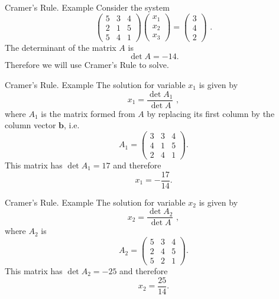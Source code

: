 \documentclass[11pt]{beamer}
\begin{document}
\begin{frame}[fragile]{Cramer's Rule. Example}
Consider the system
\begin{equation}
\begin{pmatrix}
5&3&4\\
2&1&5\\
5&4&1
\end{pmatrix}
\begin{pmatrix} 
x_1\\ x_2\\ x_3  
\end{pmatrix}
= \begin{pmatrix}3\\4\\2\end{pmatrix}\,\,.
\end{equation}
The determinant of the matrix $A$ is
\begin{equation}
\det A = -14.
\end{equation}
Therefore we will use Cramer's Rule to solve.
\end{frame}

\begin{frame}[fragile]{Cramer's Rule. Example}
The solution for variable $x_1$ is given by 
\begin{equation}
x_1 = \frac{\det A_1}{\det A}\,\,,
\end{equation}
where $A_1$ is the matrix formed from $A$ by replacing its first
column by the column vector $\mathbf{b}$, i.e.
\begin{equation}
A_1 = \begin{pmatrix}
3&3&4\\
4&1&5\\
2&4&1
\end{pmatrix}.
\end{equation}
This matrix has $\det A_1 = 17$ and therefore
\begin{equation}
x_1 =- \frac{17}{14}.
\end{equation}
\end{frame}

\begin{frame}[fragile]{Cramer's Rule. Example}
The solution for variable $x_2$ is given by 
\begin{equation}
x_2 = \frac{\det A_2}{\det A}\,\,,
\end{equation}
where $A_2$ is
\begin{equation}
A_2 = \begin{pmatrix}
5&3&4\\
2&4&5\\
5&2&1
\end{pmatrix}.
\end{equation}
This matrix has $\det A_2 = -25$ and therefore
\begin{equation}
x_2 = \frac{25}{14}.
\end{equation}
\end{frame}
\end{document}
